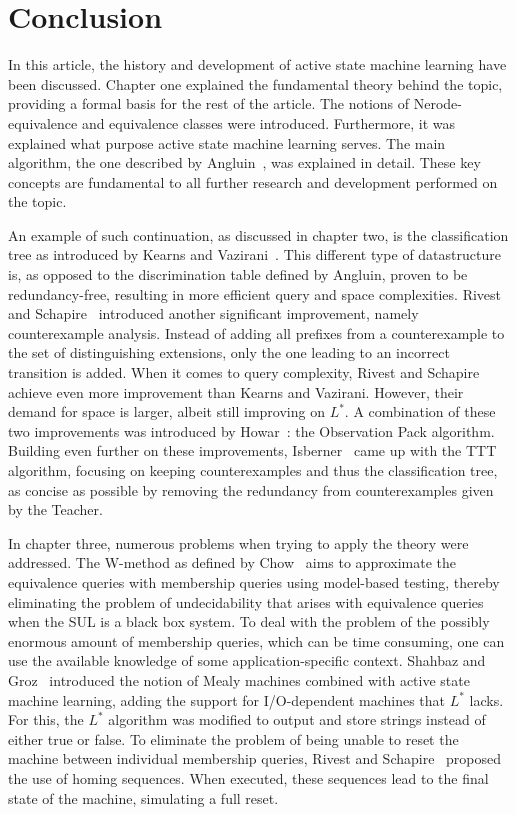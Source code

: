 \documentclass[multi,crop=false,class=article]{standalone}
\begin{document}
\section*{Conclusion}
\label{sec:conclusion}
In this article, the history and development of active state machine learning
have been discussed. Chapter one explained the fundamental theory behind the
topic, providing a formal basis for the rest of the article. The notions of
Nerode-equivalence and equivalence classes were introduced. Furthermore, it was
explained what purpose active state machine learning serves. The main algorithm,
the one described by Angluin~\cite{Angluin1987}, was explained in detail. These
key concepts are fundamental to all further research and development performed
on the topic.


An example of such continuation, as discussed in chapter two, is
the classification tree as introduced by Kearns and Vazirani~\cite{Kearns1994}.
This different type of datastructure is, as opposed to the discrimination table
defined by Angluin, proven to be redundancy-free, resulting in more efficient
query and space complexities. Rivest and Schapire~\cite{Rivest1993} introduced
another significant improvement, namely counterexample analysis. Instead of
adding all prefixes from a counterexample to the set of distinguishing
extensions, only the one leading to an incorrect transition is added. When it
comes to query complexity, Rivest and Schapire achieve even more improvement
than Kearns and Vazirani. However, their demand for space is larger, albeit
still improving on $L^*$. A combination of these two improvements was introduced
by Howar~\cite{Howar2012a,Isberner2015a}: the Observation Pack algorithm.
Building even further on these improvements, Isberner~\cite{Isberner2014b} came
up with the TTT algorithm, focusing on keeping counterexamples and thus the
classification tree, as concise as possible by removing the redundancy from
counterexamples given by the Teacher.


In chapter three, numerous problems when
trying to apply the theory were addressed. The W-method as defined by
Chow~\cite{Chow1978} aims to approximate the equivalence queries with membership
queries using model-based testing, thereby eliminating the problem of
undecidability that arises with equivalence queries when the SUL is a black box
system. To deal with the problem of the possibly enormous amount
of membership queries, which can be time consuming, one can use the available
knowledge of some application-specific context. Shahbaz and Groz~\cite{Shahbaz2009}
introduced the notion of Mealy machines combined with active state machine
learning, adding the support for I/O-dependent machines that $L^*$ lacks. For
this, the $L^*$ algorithm was modified to output and store strings instead of
either true or false. To eliminate the problem of being unable to reset the
machine between individual membership queries, Rivest and Schapire~\cite{Rivest1993}
proposed the use of homing sequences. When executed, these sequences lead to the
final state of the machine, simulating a full reset.
\end{document}
